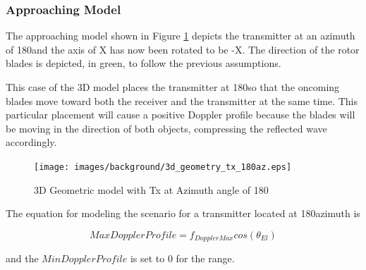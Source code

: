 
\subsubsection{Approaching Model}
The approaching model shown in Figure \ref{fig:3D_model_180az} depicts the transmitter at an azimuth of 180\textdegree \space and the axis of X has now been rotated to be -X. The direction of the rotor blades is depicted, in green, to follow the previous assumptions.

This case of the 3D model places the transmitter at 180\textdegree \space so that the oncoming blades move toward both the receiver and the transmitter at the same time. This particular placement will cause a positive Doppler profile because the blades will be moving in the direction of both objects, compressing the reflected wave accordingly.

\begin{figure}
	\begin{center}
		\texttt{[image: images/background/3d\_geometry\_tx\_180az.eps]}
		\caption{3D Geometric model with Tx at Azimuth angle of 180\textdegree}
		\label{fig:3D_model_180az}
	\end{center}
\end{figure}

The equation for modeling the scenario for a transmitter located at 180\textdegree \space azimuth is

\begin{equation}
	MaxDopplerProfile = f_{DopplerMax}cos(\theta_{El})
	\label{eq:theory_180_upper}
\end{equation}

and the $MinDopplerProfile$ is set to 0 for the range.

